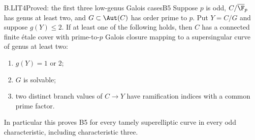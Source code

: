 \begin{claim}{B.LIT4}{Proved: the first three low-genus Galois cases}{B5}
Suppose $p$ is odd, $C/\overline{\F}_p$ has genus at least two,
and $G\subset\Aut(C)$ has order prime to $p$. Put $Y=C/G$ and
suppose $g(Y)\le2$. If at least one of the following holds, then
$C$ has a connected finite \'etale cover with prime-to-$p$ Galois
closure mapping to a supersingular curve of genus at least two:
\begin{enumerate}
\item $g(Y)=1$ or $2$;
\item $G$ is solvable;
\item two distinct branch values of $C\to Y$ have ramification
indices with a common prime factor.
\end{enumerate}
In particular this proves B5 for every tamely superelliptic curve
in every odd characteristic, including characteristic three.
\end{claim}
